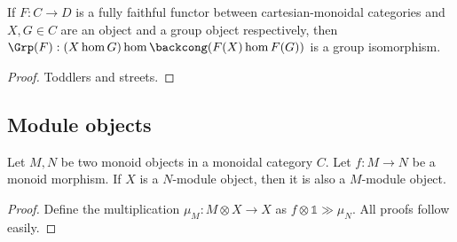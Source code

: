 \begin{lemma}
  \label{0-full-faithful-grp-hom}
  \leanok

  If $F : C \to D$ is a fully faithful functor between cartesian-monoidal categories
  and $X, G \in C$ are an object and a group object respectively,
  then $\Grp(F) : (X \hom G) \hom \backcong (F(X) \hom F(G))$ is a group isomorphism.
\end{lemma}
\begin{proof}
  \uses{}
  \leanok

  Toddlers and streets.
\end{proof}


\subsection{Module objects}


\begin{proposition}
  \label{0-comap-mod}
  \uses{}

  Let $M, N$ be two monoid objects in a monoidal category $C$.
  Let $f : M \to N$ be a monoid morphism.
  If $X$ is a $N$-module object, then it is also a $M$-module object.
\end{proposition}
\begin{proof}
  \uses{}

  Define the multiplication $\mu_M : M \otimes X \to X$ as $f \otimes \mathbb 1 \gg \mu_N$.
  All proofs follow easily.
\end{proof}
